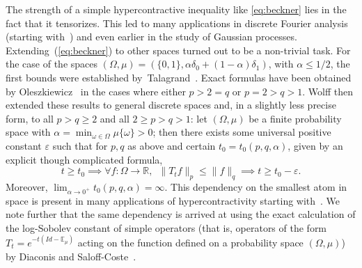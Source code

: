 \documentclass[11pt]{amsart}
\newcommand{\R}{\mathbb{R}}
\newcommand{\E}{\mathbb{E}}
\newcommand{\1}{\mathbf{1}}
\def\R{{\mathbb R}}
\def\E{{\mathbb E}}
\theoremstyle{definition}
\theoremstyle{plain}
\theoremstyle{remark}
\numberwithin{equation}{section}
\begin{document}
The strength of a simple hypercontractive inequality  like \eqref{eq:beckner} lies in the fact that it  tensorizes. This led to many applications in discrete Fourier analysis (starting with~\cite{KaKaLi:88})
and even earlier in the study of Gaussian processes.
Extending~(\ref{eq:beckner}) to other spaces turned out to be a non-trivial task.
For the case of the spaces $(\Omega,\mu) = (\{0,1\}, \alpha \delta_0 + (1-\alpha) \delta_1)$, with $\alpha \leq 1/2$,
the first bounds were established by~Talagrand~\cite{Talagrand:94}.
Exact formulas have been obtained
by Oleszkiewicz~\cite{Oleszkiewicz:03} in the cases where either $p>2=q$ or $p=2>q>1$.
Wolff then extended these results \cite{Wolff:07} to general discrete spaces and, in a slightly less precise form,
to all $p>q \geq 2$ and all $2 \geq p>q>1$: let $(\Omega,\mu)$ be a finite probability space with
$\alpha = \min_{\omega \in \Omega} \mu \{\omega\}>0$; then there exists some universal positive constant $\varepsilon$ such that
for $p, q$ as above and certain $t_{0}=t_{0}(p,q,\alpha)$, given by an explicit though complicated formula,
\[
t \geq t_{0} \implies \forall f : \Omega \to \R,\,\,\, \| T_t f  \|_p \leq \| f \|_q
\implies t \geq t_{0}-\varepsilon.
\]
Moreover, $\lim_{\alpha \to 0^{+}} t_{0}(p,q,\alpha)=\infty$. This dependency on the smallest atom in space is present in many applications of hypercontractivity starting with~\cite{Talagrand:94}. We note further that the same dependency is arrived at using the exact calculation of the log-Sobolev constant
of simple operators (that is,   operators of the form $T_t = e^{-t(Id-\E_\mu)}$ acting on the function defined on a probability space $(\Omega, \mu)$)  by Diaconis and Saloff-Coste~\cite{DiaconisSaloff-Coste:96}.
\end{document}
